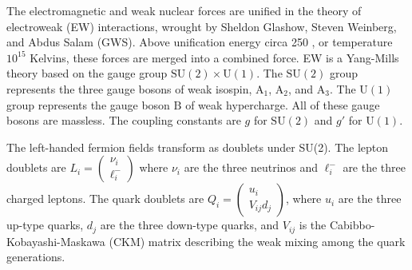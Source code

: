 The electromagnetic and weak nuclear forces are unified in the theory of electroweak (EW) interactions,
wrought by Sheldon Glashow, Steven Weinberg, and Abdus Salam (GWS).
Above unification energy circa 250 \GeV, or temperature $10^{15}$ Kelvins, these forces are merged into a combined force.
EW is a Yang-Mills theory based on the gauge group $\mathrm{SU}(2) \times \mathrm{U}(1)$.
The $\mathrm{SU}(2)$ group represents the three gauge bosons of weak isospin, 
$\mathrm{A}_1$, $\mathrm{A}_2$, and $\mathrm{A}_3$.
The $\mathrm{U}(1)$ group represents the gauge boson $\mathrm{B}$ of weak hypercharge.
All of these gauge bosons are massless. 
The coupling constants are $g$ for $\mathrm{SU}(2)$ and $g'$ for $\mathrm{U}(1)$.

The left-handed fermion fields transform as doublets under SU(2).
The lepton doublets are $L_i = \begin{pmatrix}\nu_i \\ \ell_i^{-} \end{pmatrix}$ where $\nu_i$ are the three neutrinos and $\ell_i^{-}$ are the three charged leptons.
The quark doublets are $Q_i = \begin{pmatrix} u_i \\ V_{ij} d_j \end{pmatrix}$, 
where $u_i$ are the three up-type quarks, $d_j$ are the three down-type quarks,
and $V_{ij}$ is the Cabibbo-Kobayashi-Maskawa (CKM) matrix describing the weak mixing among the quark generations.

